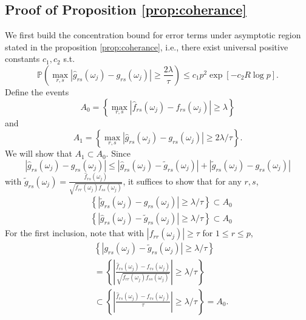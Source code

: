 \subsection{Proof of Proposition \ref{prop:coherance}}
We first build the concentration bound for error terms under asymptotic  region stated in the proposition \ref{prop:coherance}, i.e.,  there exist universal positive constants $c_1, c_2$ s.t.
\begin{equation}
\mathbb{P}\left(\max_{r,s} |\hat{g}_{rs}(\omega_j) - g_{rs}(\omega_j)|\ge \frac{2\lambda}{\tau}\right)\le c_1 p^2 \exp[-c_2 R\log p].
\end{equation}
Define the events 
\begin{equation}
A_0 = \left\{\max_{r, s}|\hat{f}_{rs}(\omega_j)-f_{rs}(\omega_j)|\ge \lambda \right\} \nonumber
\end{equation}
and 
\begin{equation}
A_1 = \left\{\max_{r, s}|\hat{g}_{rs}(\omega_j)-g_{rs}(\omega_j)|\ge 2\lambda/\tau \right\}. \nonumber
\end{equation}
We will show that 
$A_1\subset A_0$. Since 
\begin{equation}
|\hat{g}_{rs}(\omega_j)-g_{rs}(\omega_j)| \le    |\hat{g}_{rs}(\omega_j)-\tilde{g}_{rs}(\omega_j)|+|\tilde{g}_{rs}(\omega_j)-g_{rs}(\omega_j)| \nonumber
\end{equation}
with $\tilde{g}_{rs}(\omega_j) = \frac{\hat{f}_{rs}(\omega_j)}{\sqrt{f_{rr}(\omega_j)f_{ss}(\omega_j)}}$, it suffices to show that for any $r,s$, 
\begin{equation*}
\begin{aligned}
& \left\{|\tilde{g}_{rs}(\omega_j)-g_{rs}(\omega_j)| \ge \lambda/\tau\right\}\subset A_0\\
&\left\{|\hat{g}_{rs}(\omega_j)-\tilde{g}_{rs}(\omega_j)| \ge \lambda/\tau\right\}\subset A_0 
\end{aligned}
\end{equation*}
For the first inclusion, note that with $|f_{rr}(\omega_j)|\ge \tau$ for $1\le r\le p$, 
\begin{equation*}
\begin{aligned}
&\left\{|g_{rs}(\omega_j)-\tilde{g}_{rs}(\omega_j)| \ge \lambda/\tau \right\}\\
&= \left\{\left|\frac{\hat{f}_{rs}(\omega_j) - f_{rs}(\omega_j)}{\sqrt{f_{rr}(\omega_j)f_{ss}(\omega_j)}}\right| \ge \lambda/\tau\right\}\\
&\subset \left\{\left|\frac{\hat{f}_{rs}(\omega_j) - f_{rs}(\omega_j)}{\tau}\right| \ge \lambda/\tau\right\} = A_0.\\
\end{aligned}
\end{equation*}
